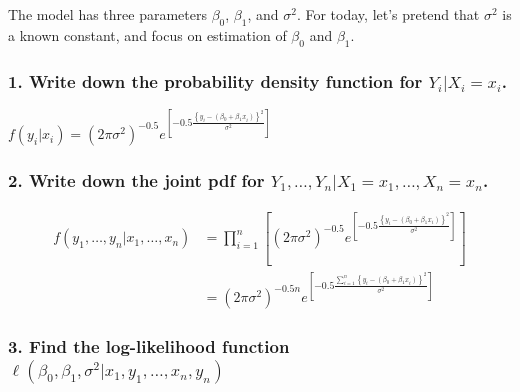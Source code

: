 \documentclass[]{article}
\begin{document}
The model has three parameters \(\beta_0\), \(\beta_1\), and
\(\sigma^2\). For today, let's pretend that \(\sigma^2\) is a known
constant, and focus on estimation of \(\beta_0\) and \(\beta_1\).

\subsubsection{\texorpdfstring{1. Write down the probability density
function for
\(Y_i | X_i = x_i\).}{1. Write down the probability density function for Y\_i \textbar{} X\_i = x\_i.}}\label{write-down-the-probability-density-function-for-y_i-x_i-x_i.}

\(f(y_i | x_i) = (2 \pi \sigma^2)^{-0.5} e^{\left[ -0.5 \frac{\left\{y_i - (\beta_0 + \beta_1 x_i)\right\}^2}{\sigma^2} \right]}\)

\vspace{3cm}

\subsubsection{\texorpdfstring{2. Write down the joint pdf for
\(Y_1, \ldots, Y_n | X_{1} = x_1, \ldots, X_{n} = x_{n}\).}{2. Write down the joint pdf for Y\_1, \textbackslash{}ldots, Y\_n \textbar{} X\_\{1\} = x\_1, \textbackslash{}ldots, X\_\{n\} = x\_\{n\}.}}\label{write-down-the-joint-pdf-for-y_1-ldots-y_n-x_1-x_1-ldots-x_n-x_n.}

\begin{align*}
f(y_1, \ldots, y_n | x_1, \ldots, x_n) &= \prod_{i = 1}^n \left[(2 \pi \sigma^2)^{-0.5} e^{\left[ -0.5 \frac{\left\{y_i - (\beta_0 + \beta_1 x_i)\right\}^2}{\sigma^2} \right]}\right] \\
 &= (2 \pi \sigma^2)^{-0.5n} e^{\left[ -0.5 \frac{\sum_{i = 1}^n\left\{y_i - (\beta_0 + \beta_1 x_i)\right\}^2}{\sigma^2} \right]}
\end{align*}

\vspace{6cm}

\subsubsection{\texorpdfstring{3. Find the log-likelihood function
\(\ell(\beta_0, \beta_1, \sigma^2 | x_1, y_1, \ldots, x_n, y_n)\)}{3. Find the log-likelihood function \textbackslash{}ell(\textbackslash{}beta\_0, \textbackslash{}beta\_1, \textbackslash{}sigma\^{}2 \textbar{} x\_1, y\_1, \textbackslash{}ldots, x\_n, y\_n)}}\label{find-the-log-likelihood-function-ellbeta_0-beta_1-sigma2-x_1-y_1-ldots-x_n-y_n}
\end{document}
